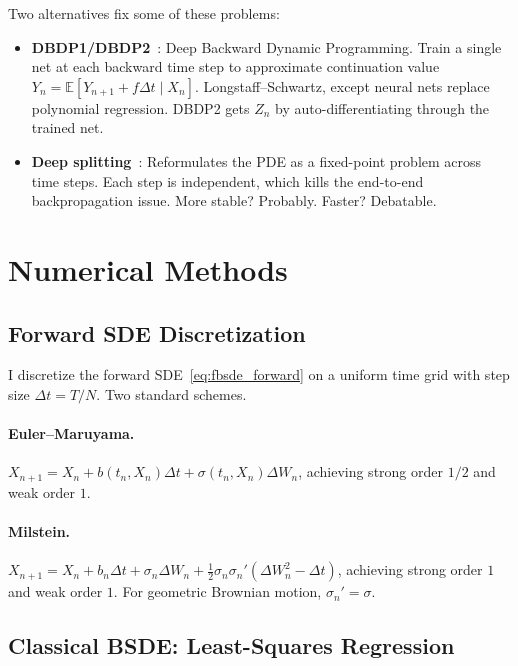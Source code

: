 \documentclass[11pt]{article}
\theoremstyle{definition}
\theoremstyle{remark}
\newcommand{\E}{\mathbb{E}}
\begin{document}
Two alternatives fix some of these problems:
\begin{itemize}
  \item \textbf{DBDP1/DBDP2}~\cite{hure2020deep}: Deep Backward
  Dynamic Programming. Train a single net at each backward time step
  to approximate continuation value
  $Y_n = \E[Y_{n+1} + f \Delta t \mid X_n]$.
  Longstaff--Schwartz, except neural nets replace polynomial regression.
  DBDP2 gets $Z_n$ by auto-differentiating through the trained net.
  \item \textbf{Deep splitting}~\cite{beck2021deep}: Reformulates the
  PDE as a fixed-point problem across time steps. Each step is
  independent, which kills the end-to-end backpropagation issue.
  More stable? Probably. Faster? Debatable.
\end{itemize}


\section{Numerical Methods}\label{sec:numerics}

\subsection{Forward SDE Discretization}\label{sec:sde_schemes}

I discretize the forward SDE~\eqref{eq:fbsde_forward} on a uniform
time grid with step size $\Delta t = T/N$. Two standard schemes.

\paragraph{Euler--Maruyama.}
$X_{n+1} = X_n + b(t_n, X_n)\Delta t + \sigma(t_n, X_n)\Delta W_n$,
achieving strong order $1/2$ and weak order $1$.

\paragraph{Milstein.}
$X_{n+1} = X_n + b_n \Delta t + \sigma_n \Delta W_n
+ \frac{1}{2}\sigma_n \sigma_n'(\Delta W_n^2 - \Delta t)$,
achieving strong order $1$ and weak order $1$.  For geometric Brownian motion,
$\sigma_n' = \sigma$.

\subsection{Classical BSDE: Least-Squares Regression}\label{sec:bsde_numerics}
\end{document}
